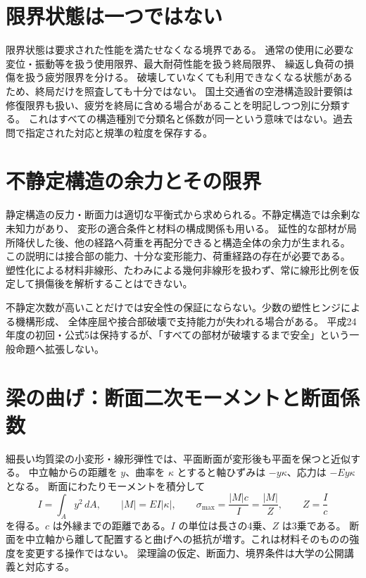 \section{限界状態は一つではない}
\label{theory:structural:limit}
限界状態は要求された性能を満たせなくなる境界である。
通常の使用に必要な変位・振動等を扱う使用限界、最大耐荷性能を扱う終局限界、
繰返し負荷の損傷を扱う疲労限界を分ける。
破壊していなくても利用できなくなる状態があるため、終局だけを照査しても十分ではない。
国土交通省の空港構造設計要領は修復限界も扱い、疲労を終局に含める場合があることを明記しつつ別に分類する\cite{struct_mlit_limit}。
これはすべての構造種別で分類名と係数が同一という意味ではない。過去問で指定された対応と規準の粒度を保存する。

\section{不静定構造の余力とその限界}
\label{theory:structural:redundancy}
静定構造の反力・断面力は適切な平衡式から求められる。不静定構造では余剰な未知力があり、
変形の適合条件と材料の構成関係も用いる。
延性的な部材が局所降伏した後、他の経路へ荷重を再配分できると構造全体の余力が生まれる。
この説明には接合部の能力、十分な変形能力、荷重経路の存在が必要である。
塑性化による材料非線形、たわみによる幾何非線形を扱わず、常に線形比例を仮定して損傷後を解析することはできない。
\begin{tcolorbox}[title=部分損傷から全体安全へ飛躍しない]
不静定次数が高いことだけでは安全性の保証にならない。少数の塑性ヒンジによる機構形成、
全体座屈や接合部破壊で支持能力が失われる場合がある。
平成24年度の初回・公式5は保持するが、「すべての部材が破壊するまで安全」という一般命題へ拡張しない。
\end{tcolorbox}

\section{梁の曲げ：断面二次モーメントと断面係数}
\label{theory:structural:beam}
細長い均質梁の小変形・線形弾性では、平面断面が変形後も平面を保つと近似する。
中立軸からの距離を \(y\)、曲率を \(\kappa\) とすると軸ひずみは \(-y\kappa\)、応力は \(-Ey\kappa\) となる。
断面にわたりモーメントを積分して
\[
 I=\int_A y^2\,dA,\qquad |M|=EI|\kappa|,\qquad
 \sigma_{\max}=\frac{|M|c}{I}=\frac{|M|}{Z},\qquad Z=\frac{I}{c}
\]
を得る。\(c\) は外縁までの距離である。\(I\) の単位は長さの4乗、\(Z\) は3乗である。
断面を中立軸から離して配置すると曲げへの抵抗が増す。これは材料そのものの強度を変更する操作ではない。
梁理論の仮定、断面力、境界条件は大学の公開講義と対応する\cite{struct_mit_beam}。

